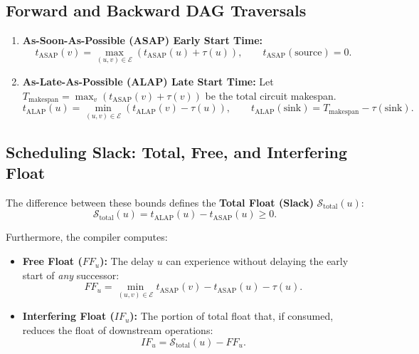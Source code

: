 \subsection{Forward and Backward DAG Traversals}
\begin{enumerate}
    \item \textbf{As-Soon-As-Possible (ASAP) Early Start Time:}
    \begin{equation}
        t_{\text{ASAP}}(v) = \max_{(u, v) \in \mathcal{E}} \left( t_{\text{ASAP}}(u) + \tau(u) \right), \qquad t_{\text{ASAP}}(\text{source}) = 0.
        \label{eq:asap_traversal_ch9_v2}
    \end{equation}
    
    \item \textbf{As-Late-As-Possible (ALAP) Late Start Time:}
    Let $T_{\text{makespan}} = \max_{v} (t_{\text{ASAP}}(v) + \tau(v))$ be the total circuit makespan.
    \begin{equation}
        t_{\text{ALAP}}(u) = \min_{(u, v) \in \mathcal{E}} \left( t_{\text{ALAP}}(v) - \tau(u) \right), \qquad t_{\text{ALAP}}(\text{sink}) = T_{\text{makespan}} - \tau(\text{sink}).
        \label{eq:alap_traversal_ch9_v2}
    \end{equation}
\end{enumerate}

\subsection{Scheduling Slack: Total, Free, and Interfering Float}
The difference between these bounds defines the \textbf{Total Float (Slack)} $\mathcal{S}_{\text{total}}(u)$:
\begin{equation}
    \mathcal{S}_{\text{total}}(u) = t_{\text{ALAP}}(u) - t_{\text{ASAP}}(u) \ge 0.
    \label{eq:slack_definition_ch9_v2}
\end{equation}

Furthermore, the compiler computes:
\begin{itemize}
    \item \textbf{Free Float ($FF_u$):} The delay $u$ can experience without delaying the early start of \textit{any} successor:
    \begin{equation}
        FF_u = \min_{(u, v) \in \mathcal{E}} t_{\text{ASAP}}(v) - t_{\text{ASAP}}(u) - \tau(u).
    \end{equation}
    \item \textbf{Interfering Float ($IF_u$):} The portion of total float that, if consumed, reduces the float of downstream operations:
    \begin{equation}
        IF_u = \mathcal{S}_{\text{total}}(u) - FF_u.
    \end{equation}
\end{itemize}

